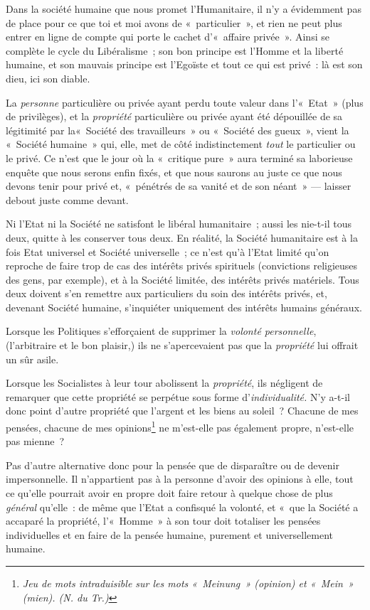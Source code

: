 \documentclass[french,twoside]{book} %
\begin{document}
\noindent Dans la société humaine que nous promet l’Humanitaire, il n’y a évidemment pas de place pour ce que toi et moi avons de « particulier », et rien ne peut plus entrer en ligne de compte qui porte le cachet d’« affaire privée ». Ainsi se complète le cycle du Libéralisme ; son bon principe est l’Homme et la liberté humaine, et son mauvais principe est l’Egoïste et tout ce qui est privé : là est son dieu, ici son diable.\par
 La \emph{personne} particulière ou privée ayant perdu toute valeur dans l’« Etat » (plus de privilèges), et la \emph{propriété} particulière ou privée ayant été dépouillée de sa légitimité par la« Société des travailleurs » ou « Société des gueux », vient la « Société humaine » qui, elle, met de côté indistinctement \emph{tout} le particulier ou le privé. Ce n’est que le jour où la « critique pure » aura terminé sa laborieuse enquête que nous serons enfin fixés, et que nous saurons au juste ce que nous devons tenir pour privé et, « pénétrés de sa vanité et de son néant » — laisser debout juste comme devant.\par
Ni l’Etat ni la Société ne satisfont le libéral humanitaire ; aussi les nie-t-il tous deux, quitte à les conserver tous deux. En réalité, la Société humanitaire est à la fois Etat universel et Société universelle ; ce n’est qu’à l’Etat limité qu’on reproche de faire trop de cas des intérêts privés spirituels (convictions religieuses des gens, par exemple), et à la Société limitée, des intérêts privés matériels. Tous deux doivent s’en remettre aux particuliers du soin des intérêts privés, et, devenant Société humaine, s’inquiéter uniquement des intérêts humains généraux.\par
Lorsque les Politiques s’efforçaient de supprimer la \emph{volonté personnelle}, (l’arbitraire et le bon plaisir,) ils ne s’apercevaient pas que la \emph{propriété} lui offrait un sûr asile.\par
Lorsque les Socialistes à leur tour abolissent la \emph{propriété}, ils négligent de remarquer que cette propriété se perpétue sous forme d’\emph{individualité.} N’y a-t-il donc point d’autre propriété que l’argent et les biens au soleil ? Chacune de mes pensées, chacune de mes opinions\footnote{ \noindent \emph{Jeu de mots intraduisible sur les mots « Meinung » (opinion) et « Mein » (mien). (N. du Tr.)}
 } ne m’est-elle pas également propre, n’est-elle pas mienne ?\par
Pas d’autre alternative donc pour la pensée que de  disparaître ou de devenir impersonnelle. Il n’appartient pas à la personne d’avoir des opinions à elle, tout ce qu’elle pourrait avoir en propre doit faire retour à quelque chose de plus \emph{général} qu’elle : de même que l’Etat a confisqué la volonté, et « que la Société a accaparé la propriété, l’« Homme » à son tour doit totaliser les pensées individuelles et en faire de la pensée humaine, purement et universellement humaine.\par
\end{document}
